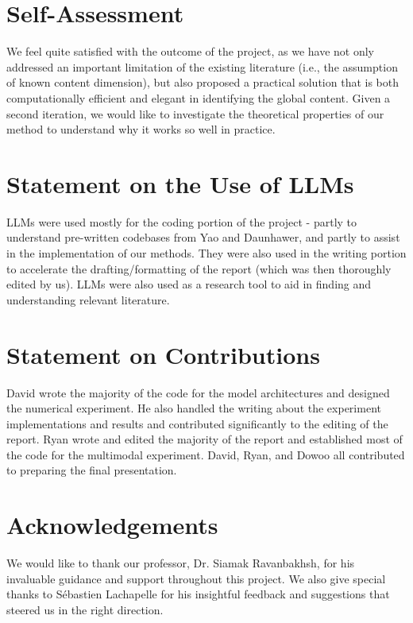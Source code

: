 \documentclass[a4paper,12pt]{article}
\begin{document}
\newpage
\section*{Self-Assessment}

We feel quite satisfied with the outcome of the project, as we have not only addressed an important limitation of the existing literature (i.e., the assumption of known content dimension), but also proposed a practical solution that is both computationally efficient and elegant in identifying the global content. Given a second iteration, we would like to investigate the theoretical properties of our method to understand why it works so well in practice.

\section*{Statement on the Use of LLMs}

LLMs were used mostly for the coding portion of the project - partly to understand pre-written codebases from Yao and Daunhawer, and partly to assist in the implementation of our methods. They were also used in the writing portion to accelerate the drafting/formatting of the report (which was then thoroughly edited by us).
LLMs were also used as a research tool to aid in finding and understanding relevant literature.

\section*{Statement on Contributions}

David wrote the majority of the code for the model architectures and designed the numerical experiment.
He also handled the writing about the experiment implementations and results and contributed significantly to the editing of the report.
Ryan wrote and edited the majority of the report and established most of the code for the multimodal experiment. David, Ryan, and Dowoo all contributed to preparing the final presentation.

\section*{Acknowledgements}

We would like to thank our professor, Dr. Siamak Ravanbakhsh, for his invaluable guidance and support throughout this project. We also give special thanks to Sébastien Lachapelle for his insightful feedback and suggestions that steered us in the right direction.
\end{document}

